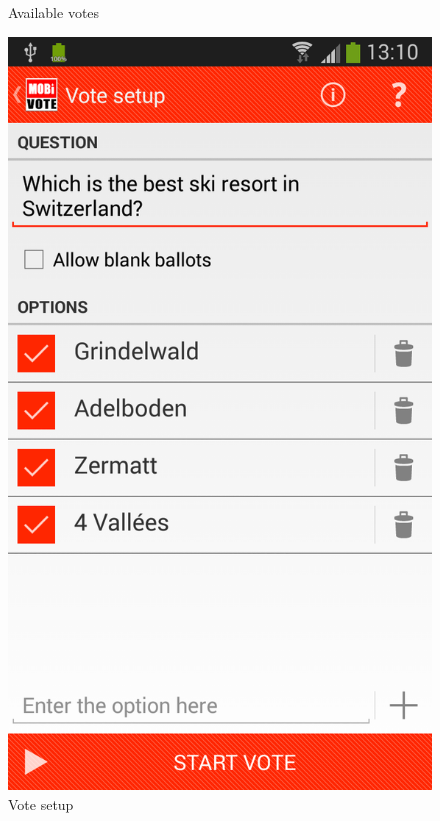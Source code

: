 \documentclass[numbers=noenddot, abstract=on, a4paper, headsepline,
footsepline, oneside, openright, draft=off, listof=leveldown]{scrreprt}
\begin{document}
\begin{figure}[!htb]
\begin{minipage}{.5\textwidth}
		\caption{Available votes}
		\label{fig:handbook_votes}
	\end{minipage}
	\begin{minipage}{.5\textwidth}
  		\centering
		\includegraphics[height=.4\textheight]{img/screenshots/vote_details}
		\caption{Vote setup}
		\label{fig:handbook_votesetup}
	\end{minipage}
\end{figure}
\end{document}
